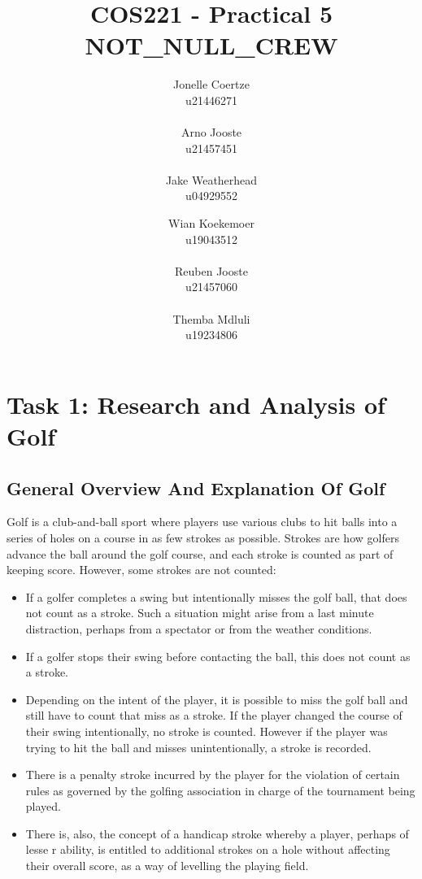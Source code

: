 \documentclass[titlepage]{article}
\title{ \Huge{COS221 - Practical 5} \\  \Large{NOT\_NULL\_CREW} \vspace{0em}}
\author{%
\begin{tabular}{c c c} 
Jonelle Coertze \\ \normalsize{u21446271} \\ \\
Arno Jooste \\ \normalsize{u21457451} \\ \\
Jake Weatherhead \\ \normalsize{u04929552} \\
\end{tabular} \and
\begin{tabular}{c c c} 
Wian Koekemoer \\ \normalsize{u19043512} \\ \\
Reuben Jooste \\ \normalsize{u21457060} \\ \\
Themba Mdluli \\ \normalsize{u19234806} \\
\end{tabular}
\date{}
}
\begin{document}
\maketitle
\pagebreak


\tableofcontents
\newpage


\section{Task 1: Research and Analysis of Golf}

\subsection{General Overview And Explanation Of Golf}
Golf is a club-and-ball sport where players use various clubs to hit %
balls into a series of holes on a course in as few strokes as possible. 
Strokes are how golfers advance the ball around the golf course, and each %
stroke is counted as part of keeping score. However, some strokes are not counted: %

\begin{itemize}
  \item If a golfer completes a swing but intentionally misses the golf ball, that does %
        not count as a stroke. Such a situation might arise from a last minute distraction, %
        perhaps from a spectator or from the weather conditions.

  \item If a golfer stops their swing before contacting the ball, this does not count as a stroke.
  \item Depending on the intent of the player, it is possible to miss the golf ball and %
        still have to count that miss as a stroke. If the player changed the course of their %
        swing intentionally, no stroke is counted. However if the player was trying to hit %
        the ball and misses unintentionally, a stroke is recorded.
        
  \item There is a penalty stroke incurred by the player for the violation of certain rules %
        as governed by the golfing association in charge of the tournament being played.

  \item There is, also, the concept of a handicap stroke whereby a player, perhaps of lesse r%
        ability, is entitled to additional strokes on a hole without affecting their overall %
        score, as a way of levelling the playing field.
\end{itemize} \vspace{10pt}
\end{document}
